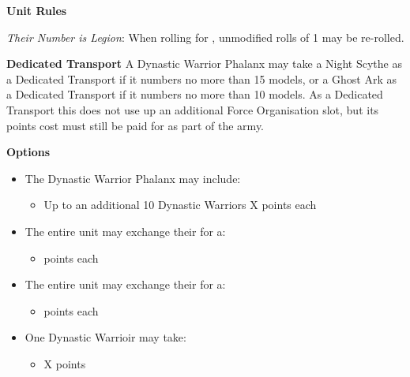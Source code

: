 \begin{minipage}[t]{0.72\textwidth}
	\vspace*{2em}
	\textbf{Unit Rules}
	
	\textit{Their Number is Legion}: When rolling for , unmodified rolls of 1 may be re-rolled.


	\vspace*{2em}
	\textbf{Dedicated Transport}
	A Dynastic Warrior Phalanx may take a Night Scythe as a Dedicated Transport if it numbers no more than 15 models, or a Ghost Ark as a Dedicated Transport if it numbers no more than 10 models. As a Dedicated Transport this does not use up an additional Force Organisation slot, but its points cost must still be paid for as part of the army.

	\vspace*{2em}
	\textbf{Options}
	\begin{itemize}
		\item The Dynastic Warrior Phalanx may include:
		\begin{itemize}
			\item Up to an additional 10 Dynastic Warriors \dotfill X points each
		\end{itemize}
		\item The entire unit may exchange their  for a:
		\begin{itemize}
			\item {}  points each
		\end{itemize}
		\item The entire unit may exchange their  for a:
		\begin{itemize}
			\item {}  points each
		\end{itemize}
		\item One Dynastic Warrioir may take:
		\begin{itemize}
			\item {} \dotfill X points
		\end{itemize} 
	\end{itemize}
\end{minipage}


\newpage
